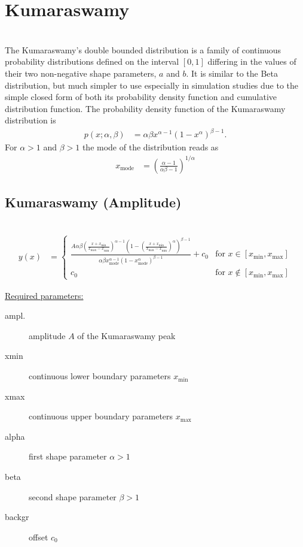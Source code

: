 \clearpage
\section{Kumaraswamy} ~\\
\label{sec:Kumaraswamy}
The Kumaraswamy's double bounded
distribution is a family of continuous probability distributions
defined on the interval $[0,1]$ differing in the values of their two
non-negative shape parameters, $a$ and $b$.
It is similar to the Beta distribution, but much simpler to use
especially in simulation studies due to the simple closed form of
both its probability density function and cumulative distribution
function. The probability density function of the Kumaraswamy distribution is
\begin{align}
p(x; \alpha,\beta) &= \alpha \beta x^{\alpha-1}{ (1-x^\alpha)}^{\beta-1}.
\end{align}
For $\alpha>1$ and $\beta>1$ the mode of the distribution reads as
\begin{align}
x_\text{mode} &= \left(\frac{\alpha-1}{\alpha\beta-1}\right)^{1/\alpha}
\end{align}

\vspace{5mm}
\subsection{Kumaraswamy (Amplitude)} ~\\
\label{sec:KumaraswamyAmplitude}
\begin{align}
y(x) & =
\begin{cases}
\frac{A\alpha \beta \left(\frac{x+x_\text{min}}{x_\text{max}-x_\text{min}}\right)^{\alpha-1}{ \left(1-\left(\frac{x+x_\text{min}}{x_\text{max}-x_\text{min}}\right)^\alpha\right)}^{\beta-1}}{\alpha \beta x_\text{mode}^{\alpha-1}{ (1-x_\text{mode}^\alpha)}^{\beta-1}}
+c_0 & \mbox{for } x \in [x_\text{min},x_\text{max}] \\
c_0 & \mbox{for } x \notin [x_\text{min},x_\text{max}]
\end{cases}
\end{align}

\underline{Required parameters:}
\begin{description}
    \item[ampl.] amplitude $A$ of the Kumaraswamy peak
    \item[xmin] continuous lower boundary parameters $x_\mathrm{min}$
    \item[xmax] continuous upper boundary parameters $x_\mathrm{max}$
    \item[alpha] first shape parameter $\alpha>1$
    \item[beta]  second shape parameter $\beta>1$
    \item[backgr] offset $c_0$
\end{description}

